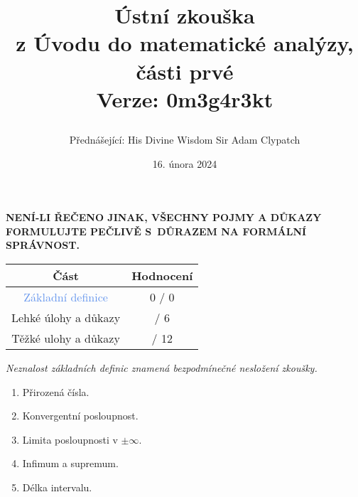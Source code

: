 \documentclass[a4paper,11pt]{article}
\title{\Huge\textsf{Ústní zkouška}\\
 \Large\textsf{z Úvodu do matematické analýzy, části prvé}\\
 \vspace*{1em}
 Verze: 0m3g4r3kt\\
 \author{Přednášející: His Divine Wisdom Sir Adam Clypatch}
 \date{16. února 2024}
}
\begin{document}
 \maketitle
 \begin{tcolorbox}[boxsep=3mm,arc=0mm,toprule=1pt,bottomrule=1pt,leftrule=-0.1mm,
   rightrule=-0.1mm,colframe=red!90!black]
  \vspace*{-2pt}
  \begin{center}
   \textbf{NENÍ-LI ŘEČENO JINAK, VŠECHNY POJMY A DŮKAZY FORMULUJTE PEČLIVĚ
   S~DŮRAZEM NA FORMÁLNÍ SPRÁVNOST.}
  \end{center}
 \end{tcolorbox}
 \vspace*{\fill}
 \begin{center}
  \begin{tabular}{c|c}
   \textsf{\textbf{Část}} & \textsf{\textbf{Hodnocení}}\\
   \toprule
   \textcolor{CornflowerBlue}{Základní definice} & 0 / 0\\
   \textcolor{Emerald}{Lehké úlohy a důkazy} & \hspace{2ex}/ 6\\
   \textcolor{BrickRed}{Těžké ulohy a důkazy} & \hspace{2ex} / 12
  \end{tabular}
 \end{center}
 \vspace*{\fill}
 \clearpage
 \begin{tcolorbox}[title=\textsf{Základní
   definice (0 bodů)},arc=0mm,boxsep=3mm,bottomrule=1pt,toprule=3pt,leftrule=-0.1mm,
   rightrule=-0.1mm,colframe=CornflowerBlue!80!white,
   colback=CornflowerBlue!5!white]
  \emph{Neznalost základních definic znamená bezpodmínečné nesložení
  zkoušky.}
  \begin{enumerate}
   \item Přirozená čísla.
   \item Konvergentní posloupnost.
   \item Limita posloupnosti v $ \pm \infty$.
   \item Infimum a supremum.
   \item Délka intervalu.
  \end{enumerate}
 \end{tcolorbox}
 \clearpage
\end{document}
